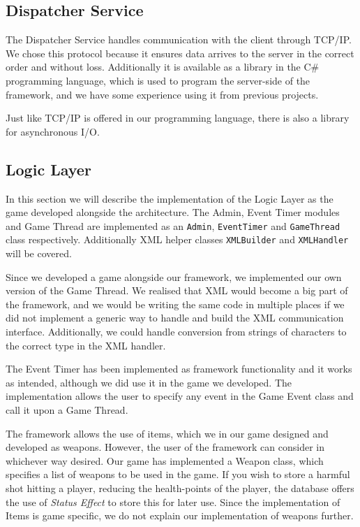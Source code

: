 \subsection{Dispatcher Service}
The Dispatcher Service handles communication with the client through TCP/IP. We chose this protocol because it ensures data arrives to the server in the correct order and without loss. Additionally it is available as a library in the C\# programming language, which is used to program the server-side of the framework, and we have some experience using it from previous projects. 

Just like TCP/IP is offered in our programming language, there is also a library for asynchronous I/O. 





\subsection{Logic Layer}
In this section we will describe the implementation of the Logic Layer as the game developed alongside the architecture. The Admin, Event Timer modules and Game Thread are implemented as an \texttt{Admin}, \texttt{EventTimer} and \texttt{GameThread} class respectively. Additionally XML helper classes \texttt{XMLBuilder} and \texttt{XMLHandler} will be covered.

Since we developed a game alongside our framework, we implemented our own version of the Game Thread. We realised that XML would become a big part of the framework, and we would be writing the same code in multiple places if we did not implement a generic way to handle and build the XML communication interface. Additionally, we could handle conversion from strings of characters to the correct type in the XML handler. 

The Event Timer has been implemented as framework functionality and it works as intended, although we did use it in the game we developed. The implementation allows the user to specify any event in the Game Event class and call it upon a Game Thread. 

The framework allows the use of items, which we in our game designed and developed as weapons. However, the user of the framework can consider in whichever way desired. Our game has implemented a Weapon class, which specifies a list of weapons to be used in the game. If you wish to store a harmful shot hitting a player, reducing the health-points of the player, the database offers the use of \textit{Status Effect} to store this for later use. Since the implementation of Items is game specific, we do not explain our implementation of weapons further.

